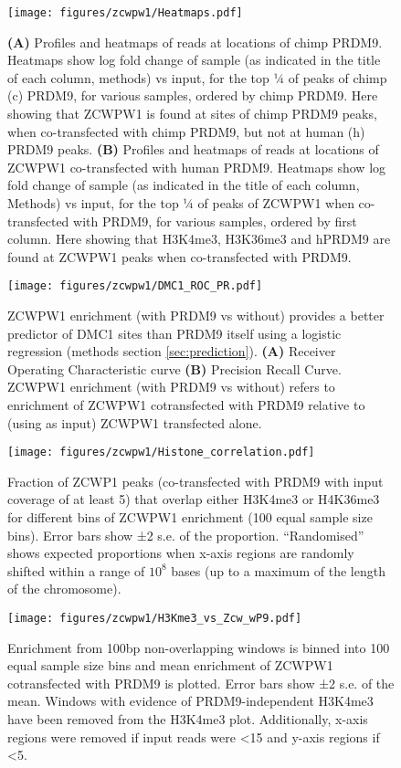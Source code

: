 \begin{figure}[H]
	\centering
	\texttt{[image: figures/zcwpw1/Heatmaps.pdf]}
	\caption[Zcwpw1 Heatmaps]{
		\textbf{(A)} Profiles and heatmaps of reads at locations of chimp PRDM9.
			Heatmaps show log fold change of sample (as indicated in the title of each column, methods) vs input, for the top ¼ of peaks of chimp (c) PRDM9, for various samples, ordered by chimp PRDM9.
			Here showing that ZCWPW1 is found at sites of chimp PRDM9 peaks, when co-transfected with chimp PRDM9, but not at human (h) PRDM9 peaks.
		\textbf{(B)} Profiles and heatmaps of reads at locations of ZCWPW1 co-transfected with human PRDM9.
			Heatmaps show log fold change of sample (as indicated in the title of each column, Methods) vs input, for the top ¼ of peaks of ZCWPW1 when co-transfected with PRDM9, for various samples, ordered by first column.
			Here showing that H3K4me3, H3K36me3 and hPRDM9 are found at ZCWPW1 peaks when co-transfected with PRDM9.
	}
	\label{fig:Heatmaps}
\end{figure}


\begin{figure}[H]
	\centering
	\texttt{[image: figures/zcwpw1/DMC1\_ROC\_PR.pdf]}
	\caption[DMC1 prediction]{
		ZCWPW1 enrichment (with PRDM9 vs without) provides a better predictor of DMC1 sites than PRDM9 itself using a logistic regression (methods section \ref{sec:prediction}).
		\textbf{(A)} Receiver Operating Characteristic curve
		\textbf{(B)} Precision Recall Curve.
			ZCWPW1 enrichment (with PRDM9 vs without) refers to enrichment of ZCWPW1 cotransfected with PRDM9 relative to (using as input) ZCWPW1 transfected alone.
	}
	\label{fig:ROC}
\end{figure}


\begin{figure}[H]
	\centering
	\texttt{[image: figures/zcwpw1/Histone\_correlation.pdf]}
	\caption[Histone Correlation from peaks]{
		Fraction of ZCWP1 peaks (co-transfected with PRDM9 with input coverage of at least 5) that overlap either H3K4me3 or H4K36me3 for different bins of ZCWPW1 enrichment (100 equal sample size bins).
		Error bars show ±2 s.e. of the proportion.
		``Randomised'' shows expected proportions when x-axis regions are randomly shifted within a range of $10^8$ bases (up to a maximum of the length of the chromosome).
	}
	\label{fig:histone_corr}
\end{figure}


\begin{figure}[H]
	\centering
	\texttt{[image: figures/zcwpw1/H3Kme3\_vs\_Zcw\_wP9.pdf]}
	\caption[Histone Correlation from windows]{
		Enrichment from 100bp non-overlapping windows is binned into 100 equal sample size bins and mean enrichment of ZCWPW1 cotransfected with PRDM9 is plotted.
		Error bars show ±2 s.e. of the mean.
		Windows with evidence of PRDM9-independent H3K4me3 have been removed from the H3K4me3 plot.
		Additionally, x-axis regions were removed if input reads were <15 and y-axis regions if <5.
	}
	\label{fig:histone_corr2}
\end{figure}


